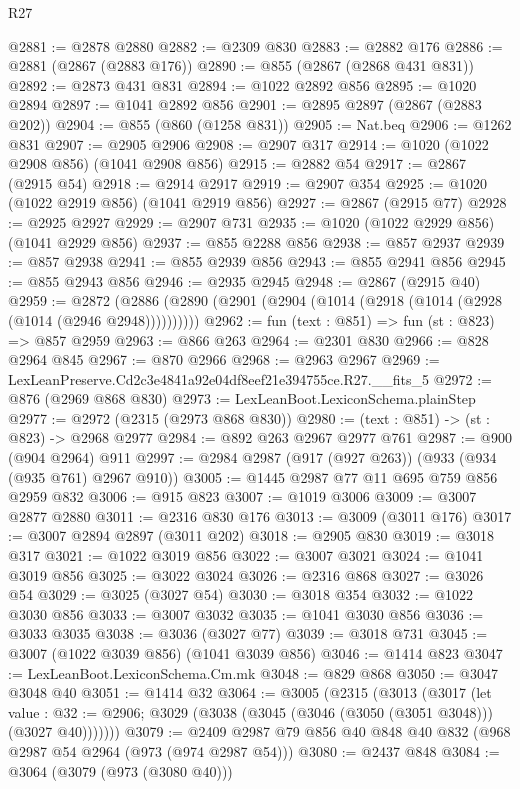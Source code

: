\begin{lexlean}{R27}
\begin{coremodule}
@2881 := @2878 @2880
@2882 := @2309 @830
@2883 := @2882 @176
@2886 := @2881 (@2867 (@2883 @176))
@2890 := @855 (@2867 (@2868 @431 @831))
@2892 := @2873 @431 @831
@2894 := @1022 @2892 @856
@2895 := @1020 @2894
@2897 := @1041 @2892 @856
@2901 := @2895 @2897 (@2867 (@2883 @202))
@2904 := @855 (@860 (@1258 @831))
@2905 := Nat.beq
@2906 := @1262 @831
@2907 := @2905 @2906
@2908 := @2907 @317
@2914 := @1020 (@1022 @2908 @856) (@1041 @2908 @856)
@2915 := @2882 @54
@2917 := @2867 (@2915 @54)
@2918 := @2914 @2917
@2919 := @2907 @354
@2925 := @1020 (@1022 @2919 @856) (@1041 @2919 @856)
@2927 := @2867 (@2915 @77)
@2928 := @2925 @2927
@2929 := @2907 @731
@2935 := @1020 (@1022 @2929 @856) (@1041 @2929 @856)
@2937 := @855 @2288 @856
@2938 := @857 @2937
@2939 := @857 @2938
@2941 := @855 @2939 @856
@2943 := @855 @2941 @856
@2945 := @855 @2943 @856
@2946 := @2935 @2945
@2948 := @2867 (@2915 @40)
@2959 := @2872 (@2886 (@2890 (@2901 (@2904 (@1014 (@2918 (@1014 (@2928 (@1014 (@2946 @2948))))))))))
@2962 := fun (text : @851) => fun (st : @823) => @857 @2959
@2963 := @866 @263
@2964 := @2301 @830
@2966 := @828 @2964 @845
@2967 := @870 @2966
@2968 := @2963 @2967
@2969 := LexLeanPreserve.Cd2c3e4841a92e04df8eef21e394755ce.R27.__fits_5
@2972 := @876 (@2969 @868 @830)
@2973 := LexLeanBoot.LexiconSchema.plainStep
@2977 := @2972 (@2315 (@2973 @868 @830))
@2980 := (text : @851) -> (st : @823) -> @2968 @2977
@2984 := @892 @263 @2967 @2977 @761
@2987 := @900 (@904 @2964) @911
@2997 := @2984 @2987 (@917 (@927 @263)) (@933 (@934 (@935 @761) @2967 @910))
@3005 := @1445 @2987 @77 @11 @695 @759 @856 @2959 @832
@3006 := @915 @823
@3007 := @1019 @3006
@3009 := @3007 @2877 @2880
@3011 := @2316 @830 @176
@3013 := @3009 (@3011 @176)
@3017 := @3007 @2894 @2897 (@3011 @202)
@3018 := @2905 @830
@3019 := @3018 @317
@3021 := @1022 @3019 @856
@3022 := @3007 @3021
@3024 := @1041 @3019 @856
@3025 := @3022 @3024
@3026 := @2316 @868
@3027 := @3026 @54
@3029 := @3025 (@3027 @54)
@3030 := @3018 @354
@3032 := @1022 @3030 @856
@3033 := @3007 @3032
@3035 := @1041 @3030 @856
@3036 := @3033 @3035
@3038 := @3036 (@3027 @77)
@3039 := @3018 @731
@3045 := @3007 (@1022 @3039 @856) (@1041 @3039 @856)
@3046 := @1414 @823
@3047 := LexLeanBoot.LexiconSchema.Cm.mk
@3048 := @829 @868
@3050 := @3047 @3048 @40
@3051 := @1414 @32
@3064 := @3005
    (@2315
      (@3013
        (@3017
          (let value : @32 := @2906;
          @3029 (@3038 (@3045 (@3046 (@3050 (@3051 @3048))) (@3027 @40)))))))
@3079 := @2409 @2987 @79 @856 @40 @848 @40 @832 (@968 @2987 @54 @2964 (@973 (@974 @2987 @54)))
@3080 := @2437 @848
@3084 := @3064 (@3079 (@973 (@3080 @40)))

\end{coremodule}
\end{lexlean}
